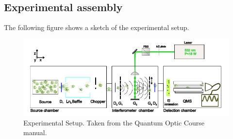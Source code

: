 \documentclass[12pt,a4paper]{article}
\begin{document}
\begin{multicols}{2}
\section{Experimental assembly}
The following figure shows a sketch of the experimental setup.
\end{multicols}
\begin{figure}[H]
 \centering
\includegraphics[scale=0.65]{./data/ExpSetup.png}
\caption{Experimental Setup. Taken from the Quantum Optic Course manual.}
\label{fig:ExpSetup}
\end{figure}
\end{document}

